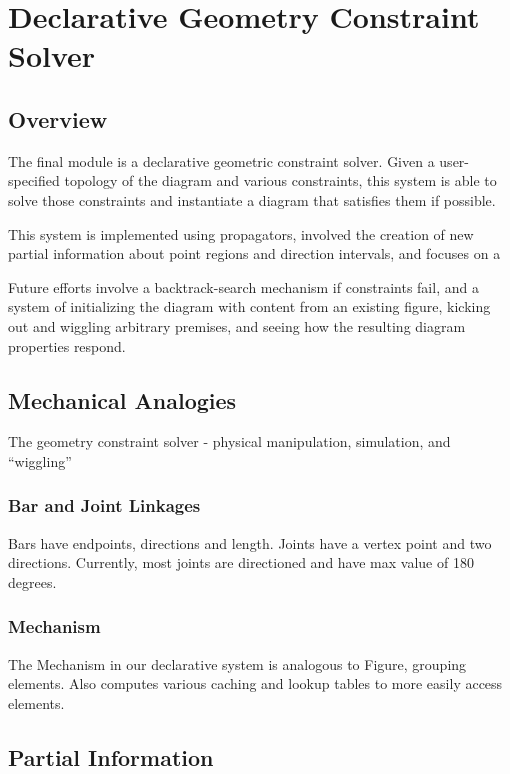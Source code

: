 \chapter{Declarative Geometry Constraint Solver}
\label{chap:declarative}

\section{Overview}

The final module is a declarative geometric constraint solver. Given
a user-specified topology of the diagram and various constraints, this
system is able to solve those constraints and instantiate a diagram
that satisfies them if possible.

This system is implemented using propagators, involved the creation of
new partial information about point regions and direction intervals,
and focuses on a

Future efforts involve a backtrack-search mechanism if constraints
fail, and a system of initializing the diagram with content from an
existing figure, kicking out and wiggling arbitrary premises, and
seeing how the resulting diagram properties respond.

\section{Mechanical Analogies}

The geometry constraint solver - physical manipulation, simulation,
and ``wiggling''

\subsection{Bar and Joint Linkages}

Bars have endpoints, directions and length. Joints have a vertex point
and two directions. Currently, most joints are directioned and have
max value of 180 degrees.

\subsection{Mechanism}

The Mechanism in our declarative system is analogous to Figure,
grouping elements. Also computes various caching and lookup tables to
more easily access elements.

\section{Partial Information}

